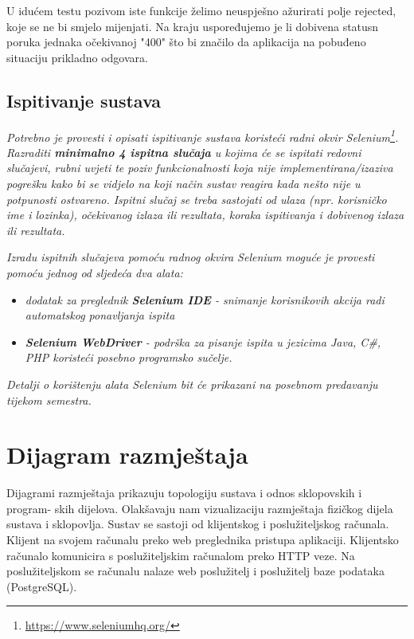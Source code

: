 U idućem testu pozivom iste funkcije želimo neuspješno ažurirati polje rejected, koje se ne bi smjelo mijenjati. Na kraju uspoređujemo je li dobivena statusn poruka jednaka očekivanoj "400" što bi značilo da aplikacija na pobuđeno situaciju prikladno odgovara.

	
			
			
			\subsection{Ispitivanje sustava}
			
			 \textit{Potrebno je provesti i opisati ispitivanje sustava koristeći radni okvir Selenium\footnote{\url{https://www.seleniumhq.org/}}. Razraditi \textbf{minimalno 4 ispitna slučaja} u kojima će se ispitati redovni slučajevi, rubni uvjeti te poziv funkcionalnosti koja nije implementirana/izaziva pogrešku kako bi se vidjelo na koji način sustav reagira kada nešto nije u potpunosti ostvareno. Ispitni slučaj se treba sastojati od ulaza (npr. korisničko ime i lozinka), očekivanog izlaza ili rezultata, koraka ispitivanja i dobivenog izlaza ili rezultata.\\ }
			 
			 \textit{Izradu ispitnih slučajeva pomoću radnog okvira Selenium moguće je provesti pomoću jednog od sljedeća dva alata:}
			 \begin{itemize}
			 	\item \textit{dodatak za preglednik \textbf{Selenium IDE} - snimanje korisnikovih akcija radi automatskog ponavljanja ispita	}
			 	\item \textit{\textbf{Selenium WebDriver} - podrška za pisanje ispita u jezicima Java, C\#, PHP koristeći posebno programsko sučelje.}
			 \end{itemize}
		 	\textit{Detalji o korištenju alata Selenium bit će prikazani na posebnom predavanju tijekom semestra.}
			
			\eject 
		
		
		\section{Dijagram razmještaja}
			
			Dijagrami razmještaja prikazuju topologiju sustava i odnos sklopovskih i program-
skih dijelova. Olakšavaju nam vizualizaciju razmještaja fizičkog dijela sustava i
sklopovlja. Sustav se sastoji od klijentskog i poslužiteljskog računala. Klijent na
svojem računalu preko web preglednika pristupa aplikaciji. Klijentsko računalo
komunicira s poslužiteljskim računalom preko HTTP veze. Na poslužiteljskom se
računalu nalaze web poslužitelj i poslužitelj baze podataka (PostgreSQL).


